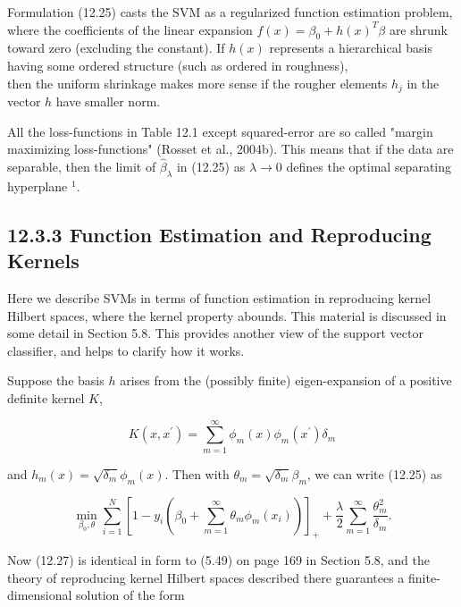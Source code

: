 \documentclass[10pt]{article}
\begin{document}
Formulation (12.25) casts the SVM as a regularized function estimation problem, where the coefficients of the linear expansion $f(x)=\beta_{0}+h(x)^{T} \beta$ are shrunk toward zero (excluding the constant). If $h(x)$ represents a hierarchical basis having some ordered structure (such as ordered in roughness),\\
then the uniform shrinkage makes more sense if the rougher elements $h_{j}$ in the vector $h$ have smaller norm.

All the loss-functions in Table 12.1 except squared-error are so called "margin maximizing loss-functions" (Rosset et al., 2004b). This means that if the data are separable, then the limit of $\hat{\beta}_{\lambda}$ in (12.25) as $\lambda \rightarrow 0$ defines the optimal separating hyperplane ${ }^{1}$.

\subsection*{12.3.3 Function Estimation and Reproducing Kernels}
Here we describe SVMs in terms of function estimation in reproducing kernel Hilbert spaces, where the kernel property abounds. This material is discussed in some detail in Section 5.8. This provides another view of the support vector classifier, and helps to clarify how it works.

Suppose the basis $h$ arises from the (possibly finite) eigen-expansion of a positive definite kernel $K$,


\begin{equation*}
K\left(x, x^{\prime}\right)=\sum_{m=1}^{\infty} \phi_{m}(x) \phi_{m}\left(x^{\prime}\right) \delta_{m} \tag{12.26}
\end{equation*}


and $h_{m}(x)=\sqrt{\delta_{m}} \phi_{m}(x)$. Then with $\theta_{m}=\sqrt{\delta_{m}} \beta_{m}$, we can write (12.25) as


\begin{equation*}
\min _{\beta_{0}, \theta} \sum_{i=1}^{N}\left[1-y_{i}\left(\beta_{0}+\sum_{m=1}^{\infty} \theta_{m} \phi_{m}\left(x_{i}\right)\right)\right]_{+}+\frac{\lambda}{2} \sum_{m=1}^{\infty} \frac{\theta_{m}^{2}}{\delta_{m}} . \tag{12.27}
\end{equation*}


Now (12.27) is identical in form to (5.49) on page 169 in Section 5.8, and the theory of reproducing kernel Hilbert spaces described there guarantees a finite-dimensional solution of the form
\end{document}
